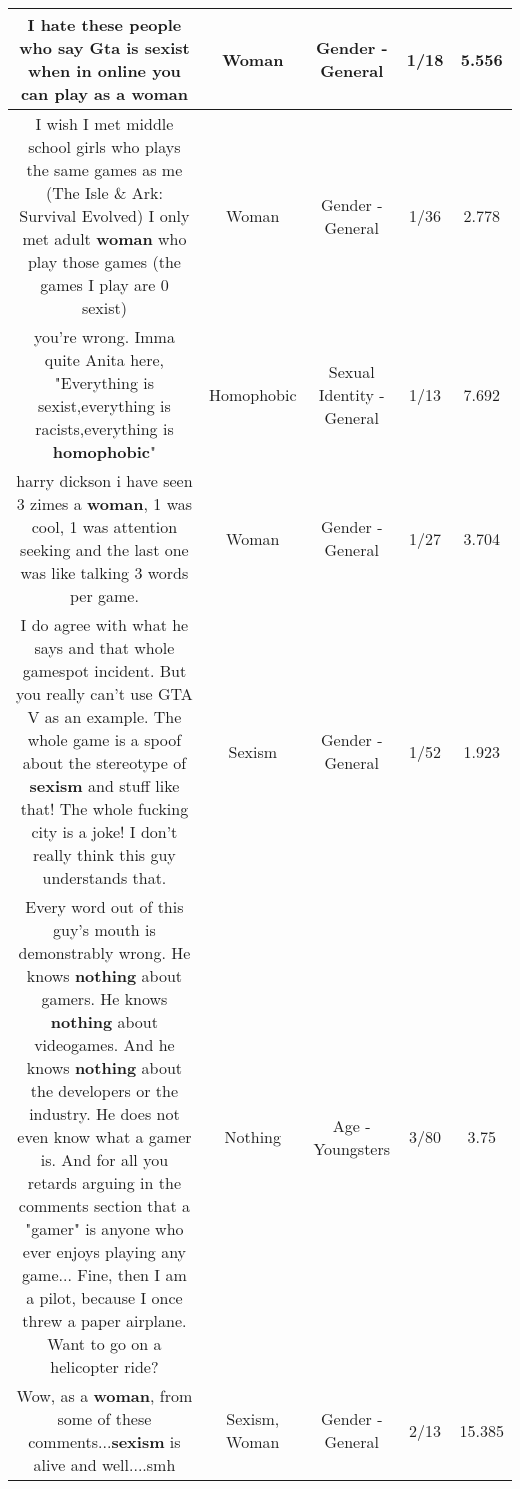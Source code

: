 \documentclass[11pt]{article}
\newlength\mylength
\begin{document}
\begin{center}
\begin{longtable}{|C{.65\mylength}|C{.30\mylength}|C{.12\mylength}|C{.12\mylength}|C{.12\mylength}|}
  \small I hate these people who say Gta is sexist when in online you can play as a woman\normalsize   & Woman & Gender - General & 1/18 & 5.556 \\  \hline
  \small I wish I met middle school girls who plays the same games as me (The Isle \& Ark: Survival Evolved) I only met adult \textbf{woman} who play those games (the games I play are 0 sexist)\normalsize   & Woman & Gender - General & 1/36 & 2.778 \\  \hline
  \small you're wrong. Imma quite Anita here, "Everything is sexist,everything is racists,everything is \textbf{homophobic}"\normalsize   & Homophobic & Sexual Identity - General & 1/13 & 7.692 \\  \hline
  \small harry dickson i have seen 3 zimes a \textbf{woman}, 1 was cool, 1 was attention seeking and the last one was like talking 3 words per game.\normalsize   & Woman & Gender - General & 1/27 & 3.704 \\  \hline
  \small I do agree with what he says and that whole gamespot incident. But you really can't use GTA V as an example. The whole game is a spoof about the stereotype of \textbf{sexism} and stuff like that! The whole fucking city is a joke! I don't really think this guy understands that.\normalsize   & Sexism & Gender - General & 1/52 & 1.923 \\  \hline
  \small Every word out of this guy's mouth is demonstrably wrong. He knows \textbf{nothing} about gamers. He knows \textbf{nothing} about videogames. And he knows \textbf{nothing} about the developers or the industry. He does not even know what a gamer is. And for all you retards arguing in the comments section that a "gamer" is anyone who ever enjoys playing any game... Fine, then I am a pilot, because I once threw a paper airplane. Want to go on a helicopter ride?\normalsize   & Nothing & Age - Youngsters & 3/80 & 3.75 \\  \hline
  \small Wow, as a \textbf{woman}, from some of these comments...\textbf{sexism} is alive and well....smh\normalsize   & Sexism, Woman & Gender - General & 2/13 & 15.385 \\  \hline

\end{longtable}
\end{center}
\end{document}
